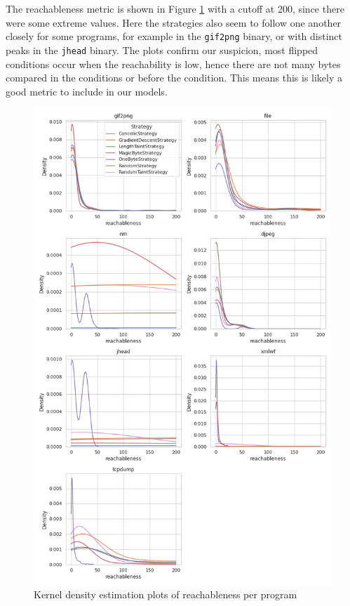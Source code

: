 The reachableness metric is shown in Figure \ref{fig:kde-reachableness} with a cutoff at 200, since there were some extreme values. Here the strategies also seem to follow one another closely for some programs, for example in the \texttt{gif2png} binary, or with distinct peaks in the \texttt{jhead} binary. The plots confirm our suspicion, most flipped conditions occur when the reachability is low, hence there are not many bytes compared in the conditions or before the condition. This means this is likely a good metric to include in our models.


\begin{figure}[p]
    \centering
    \includegraphics[width=\textwidth,height=\textheight,keepaspectratio]{5_results/graphs_new/kde_reachableness.png}  
    \caption{Kernel density estimation plots of reachableness per program}
    \label{fig:kde-reachableness}
\end{figure}


